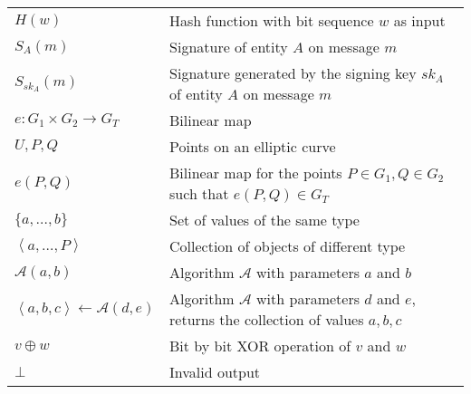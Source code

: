 \documentclass[master=eelt,masteroption=em]{kulemt}
\theoremstyle{plain}
\theoremstyle{definition}
\begin{document}
\begin{flushleft}
 \renewcommand{\arraystretch}{1.1}
 \begin{tabularx}{\textwidth}{@{}p{30mm}X@{}}
  $H \left( w \right)$ & Hash function with bit sequence $w$ as input \\
  $S_A \left( m \right)$ & Signature of entity $A$ on message $m$ \\
  $S_{sk_A} \left( m \right)$ & Signature generated by the signing key $sk_A$ of entity $A$ on message $m$ \\
  $e: G_1 \times G_2 \rightarrow G_T$ & Bilinear map \\
  $U, P, Q$ & Points on an elliptic curve \\ 
  $e \left( P, Q \right)$ & Bilinear map  for the points $P \in G_1, Q \in G_2$ such that ${e \left( P, Q \right) \in G_T}$ \\
  $\{ a, \ldots , b\}$ & Set of values of the same type \\
  $\left< a, \ldots, P \right>$ & Collection of objects of different type \\
  $\mathcal{A} \left( a, b \right)$ & Algorithm $\mathcal{A}$ with parameters $a$ and $b$ \\
  $\left< a, b, c \right> \leftarrow \mathcal{A}( d, e )$ & Algorithm $\mathcal{A}$ with parameters $d$ and $e$, returns the collection of values $a, b, c$ \\
  $v \oplus w$ & Bit by bit XOR operation of $v$ and $w$ \\
  $\bot$ & Invalid output \\
  \end{tabularx}
\end{flushleft}

\mainmatter








\appendixpage*          %
\appendix

%



\backmatter


\end{document}
